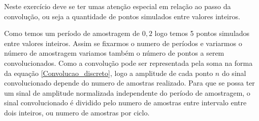 Neste exercício deve se ter umas atenção especial em relação ao passo da convolução, ou seja a quantidade de pontos simulados entre valores inteiros.  

Como temos um período de amostragem de $0,2$ logo temos 5 pontos simulados  entre valores inteiros. Assim se fixarmos o numero de períodos e variarmos o número de amostragem variamos também o número  de pontos a serem convolucionados. Como a convolução pode ser representada pela soma na forma da equação \ref{Convolucao_discreto}, logo a amplitude de cada ponto $n$ do sinal convolucionado depende do numero de amostras realizado. Para que se possa ter um sinal de amplitude normalizada independente do período de amostragem,  o sinal convolucionado é dividido pelo numero de amostras entre intervalo entre dois inteiros, ou numero de amostras por ciclo.